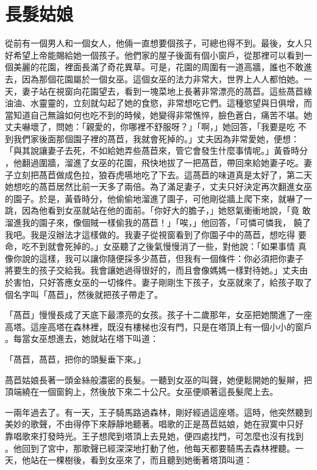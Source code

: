 \documentclass[oneside,11pt]{memoir} %
\begin{document}
\chapter{長髮姑娘}

從前有一個男人和一個女人，他倆一直想要個孩子，可總也得不到。最後，女人只
好希望上帝能賜給她一個孩子。他們家的屋子後面有個小窗戶，從那裡可以看到一
個美麗的花園，裡面長滿了奇花異草。可是，花園的周圍有一道高牆，誰也不敢進
去，因為那個花園屬於一個女巫。這個女巫的法力非常大，世界上人人都怕她。一
天，妻子站在視窗向花園望去，看到一塊菜地上長著非常漂亮的萵苣。這些萵苣綠
油油、水靈靈的，立刻就勾起了她的食慾，非常想吃它們。這種慾望與日俱增，而
當知道自己無論如何也吃不到的時候，她變得非常憔悴，臉色蒼白，痛苦不堪。她
丈夫嚇壞了，問她：「親愛的，你哪裡不舒服呀？」「啊，」她回答，「我要是吃
不到我們家後面那個園子裡的萵苣，我就會死掉的。」丈夫因為非常愛她，便想：
「與其說讓妻子去死，不如給她弄些萵苣來，管它會發生什麼事情呢。」黃昏時分
，他翻過圍牆，溜進了女巫的花園，飛快地拔了一把萵苣，帶回來給她妻子吃。妻
子立刻把萵苣做成色拉，狼吞虎嚥地吃了下去。這萵苣的味道真是太好了，第二天
她想吃的萵苣居然比前一天多了兩倍。為了滿足妻子，丈夫只好決定再次翻進女巫
的園子。於是，黃昏時分，他偷偷地溜進了園子，可他剛從牆上爬下來，就嚇了一
跳，因為他看到女巫就站在他的面前。「你好大的膽子，」她怒氣衝衝地說，「竟
敢溜進我的園子來，像個賊一樣偷我的萵苣！」「唉，」他回答，「可憐可憐我，
饒了我吧。我是沒辦法才這樣做的。我妻子從視窗看到了你園子中的萵苣，想吃得
要命，吃不到就會死掉的。」女巫聽了之後氣慢慢消了一些，對他說：「如果事情
真像你說的這樣，我可以讓你隨便採多少萵苣，但我有一個條件：你必須把你妻子
將要生的孩子交給我。我會讓她過得很好的，而且會像媽媽一樣對待她。」丈夫由
於害怕，只好答應女巫的一切條件。妻子剛剛生下孩子，女巫就來了，給孩子取了
個名字叫「萵苣」，然後就把孩子帶走了。

「萵苣」慢慢長成了天底下最漂亮的女孩。孩子十二歲那年，女巫把她關進了一座
高塔。這座高塔在森林裡，既沒有樓梯也沒有門，只是在塔頂上有一個小小的窗戶
。每當女巫想進去，她就站在塔下叫道：

「萵苣，萵苣，把你的頭髮垂下來。」

萵苣姑娘長著一頭金絲般濃密的長髮。一聽到女巫的叫聲，她便鬆開她的髮辮，把
頂端繞在一個窗鉤上，然後放下來二十公尺。女巫便順著這長髮爬上去。

一兩年過去了。有一天，王子騎馬路過森林，剛好經過這座塔。這時，他突然聽到
美妙的歌聲，不由得停下來靜靜地聽著。唱歌的正是萵苣姑娘，她在寂寞中只好
靠唱歌來打發時光。王子想爬到塔頂上去見她，便四處找門，可怎麼也沒有找到
。他回到了宮中，那歌聲已經深深地打動了他，他每天都要騎馬去森林裡聽。一
天，他站在一棵樹後，看到女巫來了，而且聽到她衝著塔頂叫道：
\end{document}
